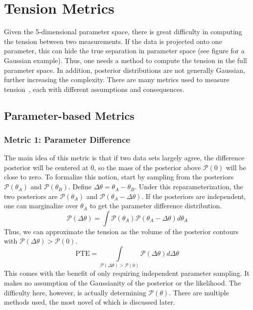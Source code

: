 \section{Tension Metrics}\label{sec:tension_metrics}
Given the 5-dimensional parameter space, there is great difficulty in computing the tension between two measurements. If the data is projected onto one parameter, this can hide the true separation in parameter space (see figure for a Gaussian example). Thus, one needs a method to compute the tension in the full parameter space. In addition, posterior distributions are not generally Gaussian, further increasing the complexity. There are many metrics used to measure tension~\cite{lemos_assessing_2021}, each with different assumptions and consequences.
\subsection{Parameter-based Metrics}
\subsubsection{Metric 1: Parameter Difference}
The main idea of this metric is that if two data sets largely agree, the difference posterior will be centered at 0, so the mass of the posterior above $\mathcal{P}(0)$ will be close to zero. To formalize this notion, start by sampling from the posteriors $\mathcal{P}(\theta_A)$ and $\mathcal{P}(\theta_B)$.
Define $\Delta\theta = \theta_A - \theta_B$. Under this reparameterization, the two posteriors are $\mathcal{P}(\theta_A)$ and $\mathcal{P}(\theta_A-\Delta\theta)$. If the posteriors are independent, one can marginalize over $\theta_A$ to get the parameter difference distribution.
\begin{equation}
    \mathcal{P}(\Delta\theta) = \int \mathcal{P}(\theta_A)\mathcal{P}(\theta_A - \Delta\theta) d\theta_A
\end{equation}
Thus, we can approximate the tension as the volume of the posterior contours with $\mathcal{P}(\Delta\theta)>\mathcal{P}(0)$.
\begin{equation}
    \mathrm{PTE} = \int\limits_{\mathcal{P}(\Delta\theta)>\mathcal{P}(0)}\mathcal{P}(\Delta\theta) d\Delta\theta
\end{equation}
This comes with the benefit of only requiring independent parameter sampling. It makes no assumption of the Gaussianity of the posterior or the likelihood. The difficulty here, however, is actually determining $\mathcal{P}(\theta)$. There are multiple methods used, the most novel of which is discussed later.

